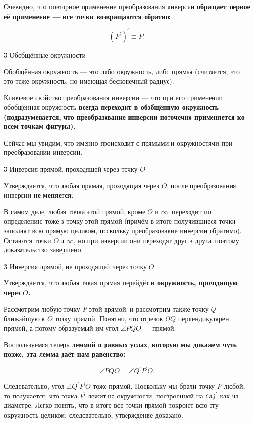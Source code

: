 Очевидно, что повторное применение преобразования инверсии \bf{обращает} первое её применение --- все точки возвращаются обратно:

$$ \left( P^\prime \right) ^\prime \equiv P. $$


\h3{ Обобщённые окружности }

Обобщённая окружность --- это либо окружность, либо прямая (считается, что это тоже окружность, но имеющая бесконечный радиус).

Ключевое свойство преобразования инверсии --- что при его применении обобщённая окружность \bf{всегда переходит в обобщённую окружность} (подразумевается, что преобразование инверсии поточечно применяется ко всем точкам фигуры).

Сейчас мы увидим, что именно происходит с прямыми и окружностями при преобразовании инверсии.


\h3{ Инверсия прямой, проходящей через точку $O$ }

Утверждается, что любая прямая, проходящая через $O$, после преобразования инверсии \bf{не меняется}.

В самом деле, любая точка этой прямой, кроме $O$ и $\infty$, переходит по определению тоже в точку этой прямой (причём в итоге получившиеся точки заполнят всю прямую целиком, поскольку преобразование инверсии обратимо). Остаются точки $O$ и $\infty$, но при инверсии они переходят друг в друга, поэтому доказательство завершено.


\h3{ Инверсия прямой, не проходящей через точку $O$ }

Утверждается, что любая такая прямая перейдёт \bf{в окружность}, проходящую через $O$.


Рассмотрим любую точку $P$ этой прямой, и рассмотрим также точку $Q$ --- ближайшую к $O$ точку прямой. Понятно, что отрезок $OQ$ перпендикулярен прямой, а потому образуемый им угол $\angle PQO$ --- прямой.

Воспользуемся теперь \bf{леммой о равных углах}, которую мы докажем чуть позже, эта лемма даёт нам равенство:

$$ \angle PQO = \angle Q^\prime P^\prime O. $$

Следовательно, угол $\angle Q^\prime P^\prime O$ тоже прямой. Поскольку мы брали точку $P$ любой, то получается, что точка $P^\prime$ лежит на окружности, построенной на $O Q^\prime$ как на диаметре. Легко понять, что в итоге все точки прямой покроют всю эту окружность целиком, следовательно, утверждение доказано.



